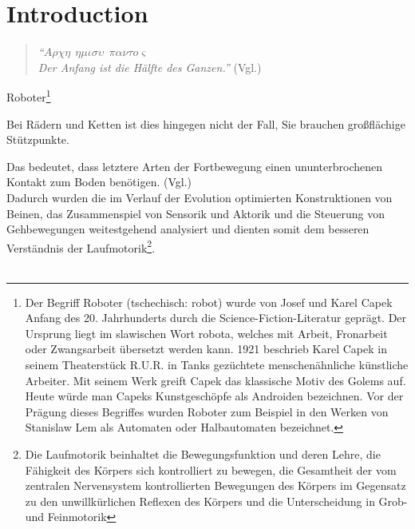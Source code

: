\chapter*{Introduction}


\begin{quotation}
\textit{\enquote{$A\rho\chi\eta\ \ \eta\mu\iota\sigma\upsilon\ \ \pi\alpha\nu\tau o \varsigma$ \\Der Anfang ist die Hälfte des Ganzen.}} (Vgl.\cite{111})
\end{quotation} 

Roboter\footnote{Der Begriff Roboter (tschechisch: robot) wurde von Josef und Karel Capek Anfang des 20. Jahrhunderts durch die Science-Fiction-Literatur geprägt. Der Ursprung liegt im slawischen Wort robota, welches mit Arbeit, Fronarbeit oder Zwangsarbeit übersetzt werden kann. 1921 beschrieb Karel Capek in seinem Theaterstück R.U.R. in Tanks gezüchtete menschenähnliche künstliche Arbeiter. Mit seinem Werk greift Capek das klassische Motiv des Golems auf. Heute würde man Capeks Kunstgeschöpfe als Androiden bezeichnen. Vor der Prägung dieses Begriffes wurden Roboter zum Beispiel in den Werken von Stanislaw Lem als Automaten oder Halbautomaten bezeichnet.}

Bei Rädern und Ketten ist dies hingegen nicht der Fall, Sie brauchen gro\ss flächige Stützpunkte. 

Das bedeutet, dass letztere Arten der Fortbewegung einen ununterbrochenen Kontakt zum Boden benötigen. (Vgl.\cite{116})\\

Dadurch wurden die im Verlauf der Evolution optimierten Konstruktionen von Beinen, das Zusammenspiel von Sensorik und Aktorik und die Steuerung von Gehbewegungen weitestgehend analysiert und dienten somit dem besseren Verständnis der Laufmotorik\footnote{Die Laufmotorik beinhaltet die Bewegungsfunktion und deren Lehre, die Fähigkeit des Körpers sich kontrolliert zu bewegen, die Gesamtheit der vom zentralen Nervensystem kontrollierten Bewegungen des Körpers im Gegensatz zu den unwillkürlichen Reflexen des Körpers und die Unterscheidung in Grob- und Feinmotorik}.\\\\ 

